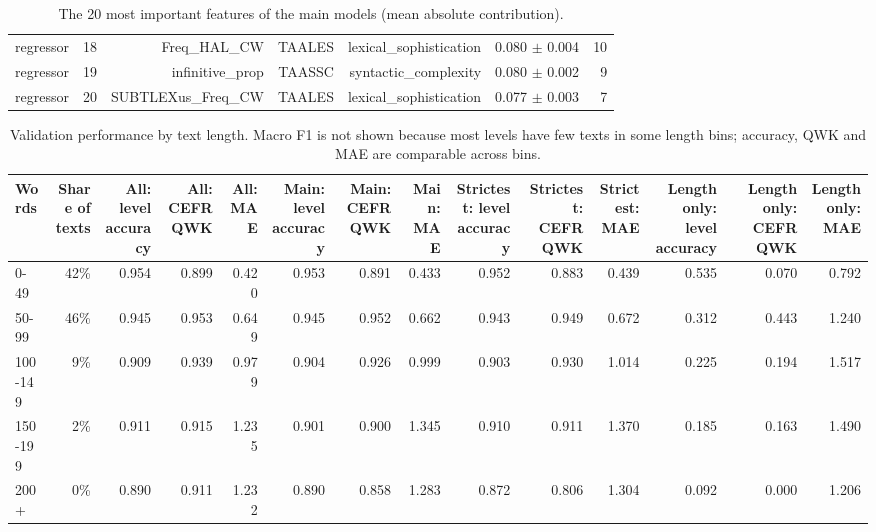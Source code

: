 \begin{table}[t]
\begin{tabular}{lrrrrrr}
regressor & 18 & Freq\_HAL\_CW & TAALES & lexical\_sophistication & 0.080 $\pm$ 0.004 & 10 \\
regressor & 19 & infinitive\_prop & TAASSC & syntactic\_complexity & 0.080 $\pm$ 0.002 & 9 \\
regressor & 20 & SUBTLEXus\_Freq\_CW & TAALES & lexical\_sophistication & 0.077 $\pm$ 0.003 & 7 \\
\bottomrule
\end{tabular}
\caption{The 20 most important features of the main models (mean absolute contribution).}
\label{tab:table_7_top_features}
\end{table}

\begin{table}[t]
\centering
\small
\begin{tabular}{lrrrrrrrrrrrrr}
\toprule
Words & Share of texts & All: level accuracy & All: CEFR QWK & All: MAE & Main: level accuracy & Main: CEFR QWK & Main: MAE & Strictest: level accuracy & Strictest: CEFR QWK & Strictest: MAE & Length only: level accuracy & Length only: CEFR QWK & Length only: MAE \\
\midrule
0-49 & 42\% & 0.954 & 0.899 & 0.420 & 0.953 & 0.891 & 0.433 & 0.952 & 0.883 & 0.439 & 0.535 & 0.070 & 0.792 \\
50-99 & 46\% & 0.945 & 0.953 & 0.649 & 0.945 & 0.952 & 0.662 & 0.943 & 0.949 & 0.672 & 0.312 & 0.443 & 1.240 \\
100-149 & 9\% & 0.909 & 0.939 & 0.979 & 0.904 & 0.926 & 0.999 & 0.903 & 0.930 & 1.014 & 0.225 & 0.194 & 1.517 \\
150-199 & 2\% & 0.911 & 0.915 & 1.235 & 0.901 & 0.900 & 1.345 & 0.910 & 0.911 & 1.370 & 0.185 & 0.163 & 1.490 \\
200+ & 0\% & 0.890 & 0.911 & 1.232 & 0.890 & 0.858 & 1.283 & 0.872 & 0.806 & 1.304 & 0.092 & 0.000 & 1.206 \\
\bottomrule
\end{tabular}
\caption{Validation performance by text length. Macro F1 is not shown because most levels have few texts in some length bins; accuracy, QWK and MAE are comparable across bins.}
\label{tab:table_8_length_check}
\end{table}

